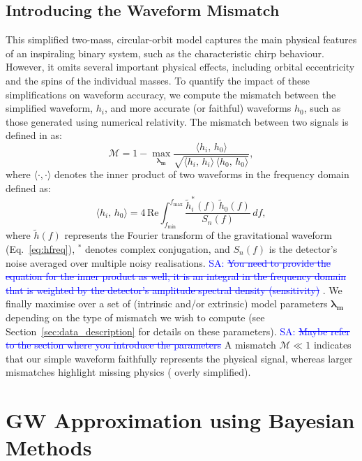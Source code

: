 \documentclass{ucdgradtaughtthesis}
\newcommand{\Sarp}[1]{{\textcolor{blue}{{SA: #1}} }}
\begin{document}
\subsection{Introducing the Waveform Mismatch}
\label{subsec:mismatch_intro}
%
%
This simplified two-mass, circular-orbit model captures the main physical features of an inspiraling binary system, such as the characteristic chirp behaviour.
However, it omits several important physical effects, including orbital eccentricity and the spins of the individual masses. 
To quantify the impact of these simplifications on waveform accuracy, we compute the mismatch between the simplified waveform, 
\( h_i \), and more accurate (or faithful) waveforms \( h_0 \), such as those generated using numerical relativity.
The mismatch between two signals is defined in \cite{mismatch, Ogpaper} as:
%
\begin{equation}
\label{eq:mismatch_def}
\mathcal{M} = 1 - \max_{\boldsymbol{\lambda_m}}
\frac{\langle h_i,\,h_0 \rangle}{\sqrt{\langle h_i,\,h_i \rangle \,\langle h_0,\,h_0 \rangle}},
\end{equation}
%
where \( \langle \cdot, \cdot \rangle \) denotes the inner product of two waveforms in the frequency domain defined as:
%
\begin{equation}
\langle h_i,\,h_0 \rangle = 4\,\mathrm{Re} \int_{f_{\text{min}}}^{f_{\text{max}}} \frac{\tilde{h}_i^*(f)\,\tilde{h}_0(f)}{S_n(f)}\,df,
\end{equation}
%
where \( \tilde{h}(f) \) represents the Fourier transform of the gravitational waveform (Eq.~\eqref{eq:hfreq}), \( ^* \) denotes complex conjugation, and \( S_n(f) \) is the detector’s noise averaged over multiple noisy realisations.
\Sarp{\sout{You need to provide the equation for the inner product as well, it is an integral in the frequency domain that
is weighted by the detector's amplitude spectral density (sensitivity)}}.
We finally maximise over a set of (intrinsic and/or extrinsic) model parameters \(\mathbf{\lambda_m}\) depending on the type of mismatch we wish to compute
 (see Section~\ref{sec:data_description} for details on these parameters).
\Sarp{\sout{Maybe refer to the section where you introduce the parameters}}
A mismatch \(\mathcal{M}\ll 1\) indicates that our simple waveform
faithfully represents the physical signal, whereas larger mismatches highlight missing
physics ( overly simplified).




\section{GW Approximation using Bayesian Methods}
\label{sec:GW_and_Bayes}
\end{document}

